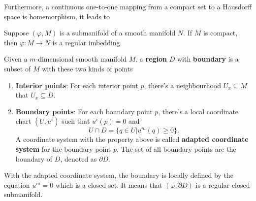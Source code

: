 Furthermore, a continuous one-to-one mapping from a compact set to a Hausdorff space is homemorphism, it leads to
\begin{theorem}
Suppose $(\varphi,M)$ is a submanifold of a smooth manifold $N$. If $M$ is compact, then $\varphi:M\to N$ is a regular imbedding. 
\end{theorem}

\begin{definition}
Given a $m$-dimensional smooth manifold $M$. a \textbf{region} $D$ with \textbf{boundary} is a subset of $M$ with these two kinds of points
\begin{enumerate}
\item \textbf{Interior points}: For each interior point $p$, there's a neighbourhood $U_x\subseteq M$ that $U_x\subseteq D$.
\item \textbf{Boundary points}: For each boundary point $p$, there's a local coordinate chart $(U,u^i)$ such that $u^i(p)=0$ and 
\begin{equation}
U\cap D=\{q\in U|u^m(q)\ge 0\}.
\end{equation}
A coordinate system with the property above is called \textbf{adapted coordinate system} for the boundary point $p$.
The set of all boundary points are the boundary of $D$, denoted as $\partial D$.
\end{enumerate}
\end{definition}

With the adapted coordinate system, the boundary is locally defined by the equation $u^m=0$ which is a closed set. It means that $(\varphi,\partial D)$ is a regular closed submanifold.
